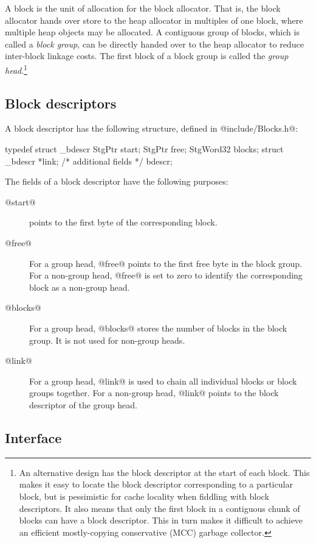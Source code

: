 \documentclass{article}
\begin{document}
A block is the unit of allocation for the block allocator. 
That is, the block allocator hands over store to the heap allocator in multiples of 
one block, where multiple heap objects may be allocated.
A contiguous group of blocks, which is called a \emph{block group}, can be 
directly handed over to the heap allocator to reduce inter-block 
linkage costs.
The first block of a block group is called the \emph{group head}.\footnote{
An alternative design has the block descriptor at the start of each block.
This makes it easy to locate the block descriptor corresponding to a particular
block, but is pessimistic for cache locality when fiddling with block descriptors.
It also means that only the first block in a contiguous chunk of blocks can
have a block descriptor. This in turn makes it difficult to achieve an
efficient mostly-copying conservative (MCC) garbage collector.}

\subsection{Block descriptors}

A block descriptor has the following structure, defined in 
@include/Blocks.h@:

\begin{code}
typedef struct _bdescr {
  StgPtr          start;
  StgPtr          free; 
  StgWord32       blocks;
  struct _bdescr  *link;
  /* additional fields */
} bdescr;
\end{code}

The fields of a block descriptor have the following purposes:

\begin{description}
\item[@start@] points to the first byte of the corresponding block.
\item[@free@] For a group head, @free@ points to the first free byte in 
the block group. For a non-group head, @free@ is set to zero to identify
the corresponding block as a non-group head.
\item[@blocks@] For a group head, @blocks@ stores the number of blocks
in the block group. It is not used for non-group heads.
\item[@link@] For a group head, @link@ is used to chain all individual 
blocks or block groups together. For a non-group head, @link@ points
to the block descriptor of the group head.
\end{description}

\subsection{Interface}
\end{document}
